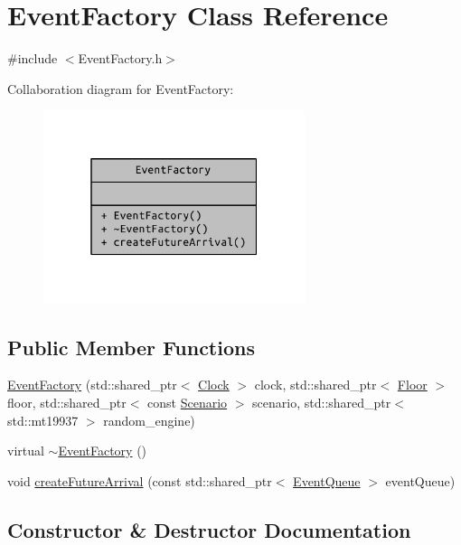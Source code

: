 \hypertarget{class_event_factory}{}\section{Event\+Factory Class Reference}
\label{class_event_factory}


{\ttfamily \#include $<$Event\+Factory.\+h$>$}



Collaboration diagram for Event\+Factory\+:
\nopagebreak
\begin{figure}[H]
\begin{center}
\leavevmode
\includegraphics[width=217pt]{class_event_factory__coll__graph}
\end{center}
\end{figure}
\subsection*{Public Member Functions}
\begin{DoxyCompactItemize}
\item 
\hyperlink{class_event_factory_ace922ce2886db334e0910b59ffd03c69}{Event\+Factory} (std\+::shared\+\_\+ptr$<$ \hyperlink{class_clock}{Clock} $>$ clock, std\+::shared\+\_\+ptr$<$ \hyperlink{class_floor}{Floor} $>$ floor, std\+::shared\+\_\+ptr$<$ const \hyperlink{class_scenario}{Scenario} $>$ scenario, std\+::shared\+\_\+ptr$<$ std\+::mt19937 $>$ random\+\_\+engine)
\item 
virtual \hyperlink{class_event_factory_ab4e7ee369071e7adb5aeb629d8b615e4}{$\sim$\+Event\+Factory} ()
\item 
void \hyperlink{class_event_factory_aa1e884d273b411a9e8265b774e6bfa8e}{create\+Future\+Arrival} (const std\+::shared\+\_\+ptr$<$ \hyperlink{class_event_queue}{Event\+Queue} $>$ event\+Queue)
\end{DoxyCompactItemize}


\subsection{Constructor \& Destructor Documentation}
\hypertarget{class_event_factory_ace922ce2886db334e0910b59ffd03c69}{}
